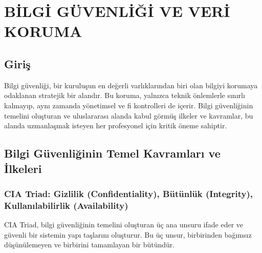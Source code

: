 ﻿\chapter{BİLGİ GÜVENLİĞİ VE VERİ KORUMA}

\section*{Giriş}
Bilgi güvenliği, bir kuruluşun en değerli varlıklarından biri olan bilgiyi korumaya odaklanan stratejik bir alandır. Bu koruma, yalnızca teknik önlemlerle sınırlı kalmayıp, aynı zamanda yönetimsel ve fi kontrolleri de içerir. Bilgi güvenliğinin temelini oluşturan ve uluslararası alanda kabul görmüş ilkeler ve kavramlar, bu alanda uzmanlaşmak isteyen her profesyonel için kritik öneme sahiptir.

\section{Bilgi Güvenliğinin Temel Kavramları ve İlkeleri}

\subsection{CIA Triad: Gizlilik (Confidentiality), Bütünlük (Integrity), Kullanılabilirlik (Availability)}

CIA Triad, bilgi güvenliğinin temelini oluşturan üç ana unsuru ifade eder ve güvenli bir sistemin yapı taşlarını oluşturur. Bu üç unsur, birbirinden bağımsız düşünülemeyen ve birbirini tamamlayan bir bütündür.

